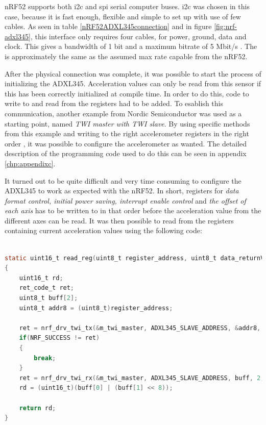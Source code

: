 \newpage

\gls{nRF52} supports both \gls{i2c} and \gls{spi} serial computer buses. \gls{i2c} was chosen in this case, because it is fast enough, flexible and simple to set up with use of few cables. As seen in table \ref{nRF52ADXL345connection} and in figure \ref{fig:nrf-adxl345}, this interface only requires four cables, for power, ground, data and clock. This gives a bandwidth of 1 bit and a maximum bitrate of 5 Mbit/s \cite{semiconductors2000i2c}. The is approximately the same as the assumed max rate capable from the \gls{nRF52}. 

After the physical connection was complete, it was possible to start the process of initializing the \gls{ADXL345}. Acceleration values can only be read from this sensor if this has been correctly initialized at compile time. In order to do this, code to write to and read from the registers had to be added. To esablish this communication, another example from Nordic Semiconductor was used as a starting point, named \textit{TWI master with TWI slave}. By using specific methods from this example and writing to the right accelerometer registers in the right order \cite{devices2009digital}, it was possible to configure the accelerometer as wanted. The detailed description of the programming code used to do this can be seen in appendix \ref{chp:appendixc}. 

It turned out to be quite difficult and very time consuming to configure the \gls{ADXL345} to work as expected with the \gls{nRF52}. In short, registers for \textit{data format control, initial power saving, interrupt enable control} and \textit{the offset of each axis} has to be written to in that order before the acceleration value from the different axes can be read. It was then possible to read from the registers containing current acceleration values using the following code: 

\begin{lstlisting}[language=C]

static uint16_t read_reg(uint8_t register_address, uint8_t data_returnValue) 
{
	uint16_t rd;
	ret_code_t ret;
	uint8_t buff[2];
    uint8_t addr8 = (uint8_t)register_address;
    
    ret = nrf_drv_twi_tx(&m_twi_master, ADXL345_SLAVE_ADDRESS, &addr8, 1, true);
    if(NRF_SUCCESS != ret)
    {
        break;
    }
    ret = nrf_drv_twi_rx(&m_twi_master, ADXL345_SLAVE_ADDRESS, buff, 2, false);
	rd = (uint16_t)(buff[0] | (buff[1] << 8));
    
    return rd;	
}

\end{lstlisting}


